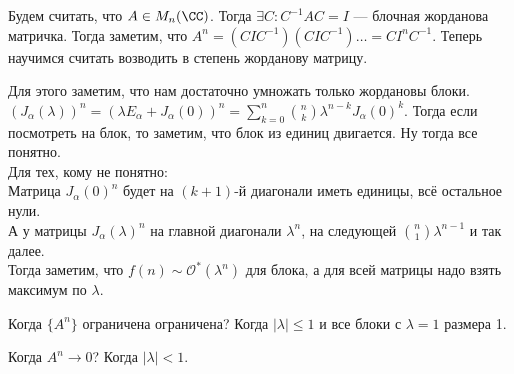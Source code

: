 Будем считать, что  $A \in M_{n}(\CC)$. Тогда  $\exists C\!: C^{-1}AC = I$ --- блочная жорданова матричка. Тогда заметим, что  $A^n = (CIC^{-1})(CIC^{-1})\ldots = CI^nC^{-1}$. Теперь научимся считать возводить в степень жорданову матрицу.

Для этого заметим, что нам достаточно умножать только жордановы блоки. $(J_\alpha(\lambda))^n = (\lambda E_{\alpha} + J_\alpha(0))^n = \sum\limits_{k=0}^n \binom{n}{k} \lambda^{n-k}J_\alpha(0)^k$. Тогда если посмотреть на блок, то заметим, что блок из единиц двигается. Ну тогда все понятно.\\
Для тех, кому не понятно:\\
Матрица $J_\alpha(0)^n$ будет на $(k+1)$-й диагонали иметь единицы, всё остальное нули.\\
А у матрицы $J_\alpha(\lambda)^n$ на главной диагонали $\lambda^n$, на следующей $\binom{n}{1} \lambda^{n-1}$ и так далее.\\

Тогда заметим, что $f(n) \sim \mathcal{O}^*(\lambda^n)$ для блока, а для всей матрицы надо взять максимум  по  $\lambda$.

Когда  $\{A^n\}$ ограничена ограничена? Когда  $|\lambda| \le 1$ и все блоки с $\lambda = 1$ размера 1.

Когда  $A^n \to 0$? Когда  $|\lambda| < 1$.

